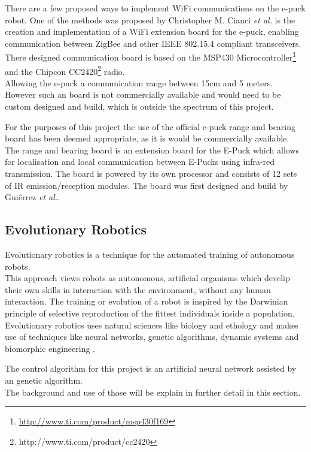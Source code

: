 There are a few proposed ways to implement WiFi communications on the e-puck robot. 
One of the methods was proposed by Christopher M. Cianci \textit{et al.}\cite{Cianci2007Communication} is the creation and implementation of a WiFi extension board for the e-puck, enabling communication between ZigBee and other IEEE 802.15.4 compliant transceivers. \\
There designed communication board is based on the MSP430 Microcontroller\footnote{\url{http://www.ti.com/product/msp430f169}} and the Chipcon CC2420\footnote{http://www.ti.com/product/cc2420} radio.\\
Allowing the e-puck a communication range between 15cm and 5 meters. \\
However such an board is not commercially available and would need to be custom designed and build, which is outside the spectrum of this project.

For the purposes of this project the use of the official e-puck range and bearing board has been deemed appropriate, as it is would be commercially available.\\
The range and bearing board is an extension board for the E-Puck which allows for localisation and local communication between E-Pucks using infra-red transmission. 
The board is powered by its own processor and consists of 12 sets of IR emission/reception modules. 
The board was first designed and build by Guiêrrez \textit{et al.}\cite{Gutierrez}. 

\subsection{Evolutionary Robotics}
Evolutionary robotics is a technique for the automated training of autonomous robots. \\
This approach views robots as autonomous, artificial organisms which develip their own skills in interaction with the environment, without any human interaction.
The training or evolution of a robot is inspired by the Darwinian principle of selective reproduction of the fittest individuals inside a population. Evolutionary robotics uses natural sciences like biology and ethology and makes use of techniques like neural networks, genetic algorithms, dynamic systems and biomorphic engineering \cite{nolfi2000evolutionary}.

The control algorithm for this project is an artificial neural network assisted by an genetic algorithm.\\
The background and use of those will be explain in further detail in this section.

